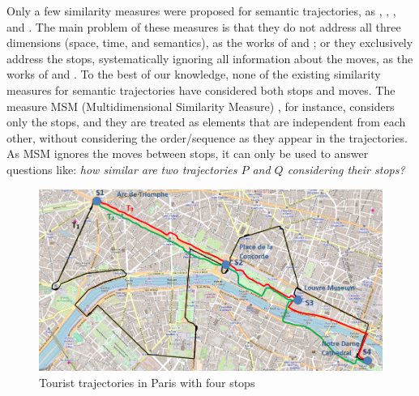Only a few  similarity measures were proposed for semantic trajectories, as  \cite{Kang:2009:SMT:1529282.1529580}, \cite{Liu:2012:SMM:2442968.2442971}, \cite{Ying:2010:MUS:1867699.1867703}, and \cite{Furtado:TGIS12156}. The main problem of these measures is that they do not address all three dimensions (space, time, and semantics), as the works of \cite{Kang:2009:SMT:1529282.1529580} and \cite{Liu:2012:SMM:2442968.2442971}; or they exclusively address the stops, systematically ignoring all information about the moves, as the works of \cite{Ying:2010:MUS:1867699.1867703} and \cite{Furtado:TGIS12156}. To the best of our knowledge, none of the existing similarity measures for semantic trajectories have considered both stops and moves. The measure MSM (Multidimensional Similarity Measure) \cite{Furtado:TGIS12156}, for instance, considers only the stops, and they are treated as elements that are independent from each other, without considering the order/sequence as they appear in the trajectories. As MSM ignores the moves between stops, it can only be used to answer questions like: \emph{how similar are two trajectories $P$ and $Q$ considering their stops?}


\begin{figure}[h]
\centering
\includegraphics[width=1.0\textwidth]{Images/paris5.png}
\caption{Tourist trajectories in Paris with four stops}
\end{figure}
\label{fig:Paris}


